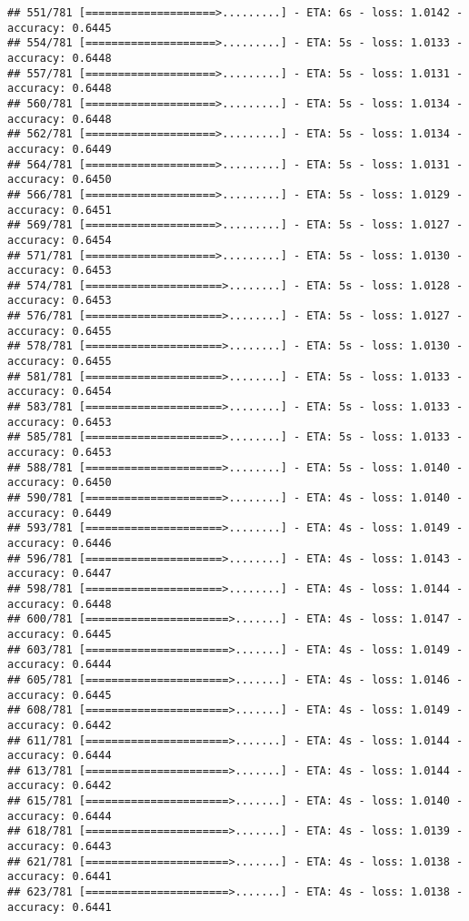 \documentclass[
]{article}
\begin{document}
\begin{verbatim}
## 551/781 [====================>.........] - ETA: 6s - loss: 1.0142 - accuracy: 0.6445
## 554/781 [====================>.........] - ETA: 5s - loss: 1.0133 - accuracy: 0.6448
## 557/781 [====================>.........] - ETA: 5s - loss: 1.0131 - accuracy: 0.6448
## 560/781 [====================>.........] - ETA: 5s - loss: 1.0134 - accuracy: 0.6448
## 562/781 [====================>.........] - ETA: 5s - loss: 1.0134 - accuracy: 0.6449
## 564/781 [====================>.........] - ETA: 5s - loss: 1.0131 - accuracy: 0.6450
## 566/781 [====================>.........] - ETA: 5s - loss: 1.0129 - accuracy: 0.6451
## 569/781 [====================>.........] - ETA: 5s - loss: 1.0127 - accuracy: 0.6454
## 571/781 [====================>.........] - ETA: 5s - loss: 1.0130 - accuracy: 0.6453
## 574/781 [=====================>........] - ETA: 5s - loss: 1.0128 - accuracy: 0.6453
## 576/781 [=====================>........] - ETA: 5s - loss: 1.0127 - accuracy: 0.6455
## 578/781 [=====================>........] - ETA: 5s - loss: 1.0130 - accuracy: 0.6455
## 581/781 [=====================>........] - ETA: 5s - loss: 1.0133 - accuracy: 0.6454
## 583/781 [=====================>........] - ETA: 5s - loss: 1.0133 - accuracy: 0.6453
## 585/781 [=====================>........] - ETA: 5s - loss: 1.0133 - accuracy: 0.6453
## 588/781 [=====================>........] - ETA: 5s - loss: 1.0140 - accuracy: 0.6450
## 590/781 [=====================>........] - ETA: 4s - loss: 1.0140 - accuracy: 0.6449
## 593/781 [=====================>........] - ETA: 4s - loss: 1.0149 - accuracy: 0.6446
## 596/781 [=====================>........] - ETA: 4s - loss: 1.0143 - accuracy: 0.6447
## 598/781 [=====================>........] - ETA: 4s - loss: 1.0144 - accuracy: 0.6448
## 600/781 [======================>.......] - ETA: 4s - loss: 1.0147 - accuracy: 0.6445
## 603/781 [======================>.......] - ETA: 4s - loss: 1.0149 - accuracy: 0.6444
## 605/781 [======================>.......] - ETA: 4s - loss: 1.0146 - accuracy: 0.6445
## 608/781 [======================>.......] - ETA: 4s - loss: 1.0149 - accuracy: 0.6442
## 611/781 [======================>.......] - ETA: 4s - loss: 1.0144 - accuracy: 0.6444
## 613/781 [======================>.......] - ETA: 4s - loss: 1.0144 - accuracy: 0.6442
## 615/781 [======================>.......] - ETA: 4s - loss: 1.0140 - accuracy: 0.6444
## 618/781 [======================>.......] - ETA: 4s - loss: 1.0139 - accuracy: 0.6443
## 621/781 [======================>.......] - ETA: 4s - loss: 1.0138 - accuracy: 0.6441
## 623/781 [======================>.......] - ETA: 4s - loss: 1.0138 - accuracy: 0.6441

\end{verbatim}
\end{document}
